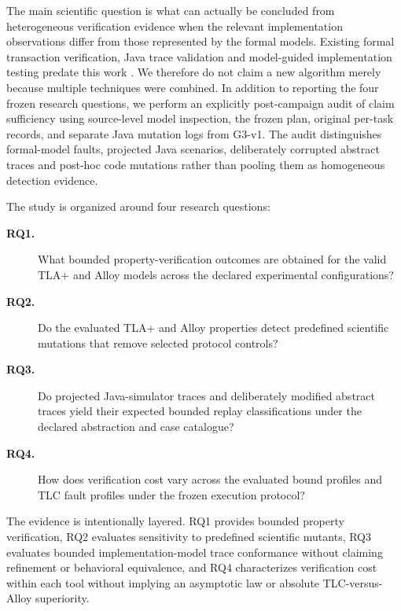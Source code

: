 The main scientific question is what can actually be concluded from
heterogeneous verification evidence when the relevant implementation
observations differ from those represented by the formal models. Existing
formal transaction verification, Java trace validation and model-guided
implementation testing predate this work
\cite{schultz2025mongodb,cirstea2025traces,hackett2025tracelink,wang2023mocket}.
We therefore do not claim a new algorithm merely because multiple techniques
were combined. In addition to reporting the four frozen research questions,
we perform an explicitly post-campaign audit of claim sufficiency using
source-level model inspection, the frozen plan, original per-task records,
and separate Java mutation logs from G3-v1. The audit distinguishes formal-model faults, projected Java
scenarios, deliberately corrupted abstract traces and post-hoc code
mutations rather than pooling them as homogeneous detection evidence.

The study is organized around four research questions:

\begin{description}
\item[\textbf{RQ1.}] What bounded property-verification outcomes are obtained
for the valid TLA+ and Alloy models across the declared experimental
configurations?

\item[\textbf{RQ2.}] Do the evaluated TLA+ and Alloy properties detect
predefined scientific mutations that remove selected protocol controls?

\item[\textbf{RQ3.}] Do projected Java-simulator traces and deliberately modified abstract
traces yield their expected bounded replay classifications under the
declared abstraction and case catalogue?

\item[\textbf{RQ4.}] How does verification cost vary across the evaluated
bound profiles and TLC fault profiles under the frozen execution protocol?
\end{description}

The evidence is intentionally layered. RQ1 provides bounded property
verification, RQ2 evaluates sensitivity to predefined scientific mutants, RQ3
evaluates bounded implementation-model trace conformance without claiming
refinement or behavioral equivalence, and RQ4 characterizes verification cost
within each tool without implying an asymptotic law or absolute
TLC-versus-Alloy superiority.

